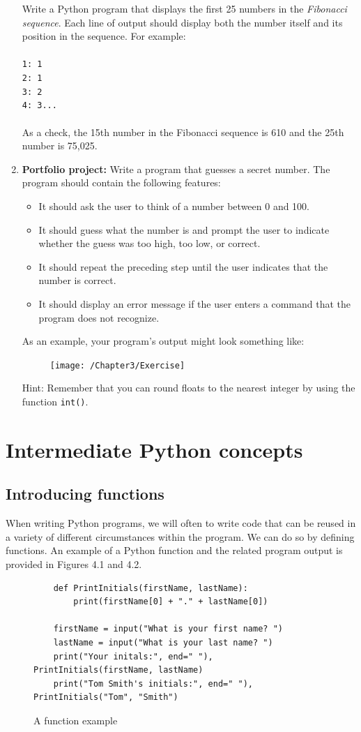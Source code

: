 \documentclass{book}
\begin{document}
\begin{enumerate}
	Write a Python program that displays the first 25 numbers in the \textit{Fibonacci sequence}. Each line of output should display both the number itself and its position in the sequence. For example:\\ \\
	\texttt{1:	1} \\ \texttt{2:  1} \\ \texttt{3:  2} \\ \texttt{4:  3...}
	\\ \\ As a check, the 15th number in the Fibonacci sequence is 610 and the 25th number is 75,025.
	\item \textbf{Portfolio project:} Write a program that guesses a secret number. The program should contain the following features:
	\begin{itemize}
		\item It should ask the user to think of a number between 0 and 100.
		\item It should guess what the number is and prompt the user to indicate whether the guess was too high, too low, or correct.
		\item It should repeat the preceding step until the user indicates that the number is correct.
		\item It should display an error message if the user enters a command that the program does not recognize.
	\end{itemize}
	As an example, your program's output might look something like:
	\begin{figure}[h]
		\centering\texttt{[image: /Chapter3/Exercise]}
	\end{figure}

	Hint: Remember that you can round floats to the nearest integer by using the function \texttt{int()}.	
\end{enumerate}

\chapter{Intermediate Python concepts}
\section{Introducing functions}
When writing Python programs, we will often to write code that can be reused in a variety of different circumstances within the program. We can do so by defining functions. An example of a Python function and the related program output is provided in Figures 4.1 and 4.2.
\begin{figure}[h]
\caption{A function example}
\begin{lstlisting}
	def PrintInitials(firstName, lastName):
		print(firstName[0] + "." + lastName[0])
	
	firstName = input("What is your first name? ")
	lastName = input("What is your last name? ")
	print("Your initals:", end=" "), PrintInitials(firstName, lastName)
	print("Tom Smith's initials:", end=" "), PrintInitials("Tom", "Smith")
\end{lstlisting}
\end{figure}
\end{document}
